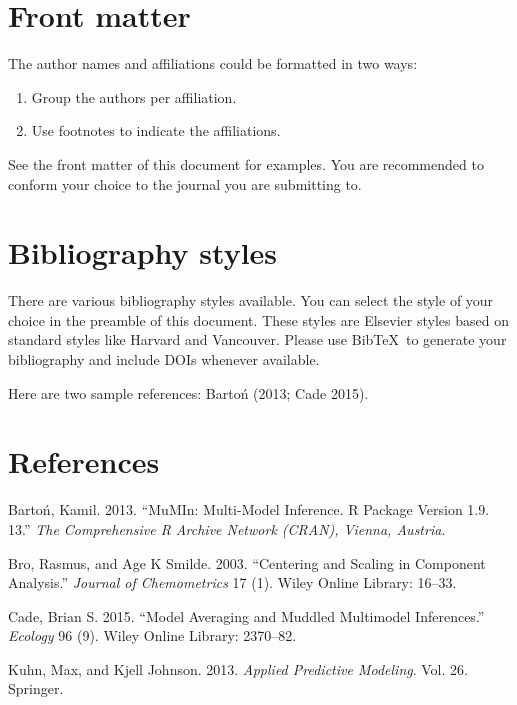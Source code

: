 \documentclass[]{elsarticle} %
\begin{document}
\section{Front matter}\label{front-matter}

The author names and affiliations could be formatted in two ways:

\begin{enumerate}
\def\labelenumi{(\arabic{enumi})}
\item
  Group the authors per affiliation.
\item
  Use footnotes to indicate the affiliations.
\end{enumerate}

See the front matter of this document for examples. You are recommended
to conform your choice to the journal you are submitting to.

\section{Bibliography styles}\label{bibliography-styles}

There are various bibliography styles available. You can select the
style of your choice in the preamble of this document. These styles are
Elsevier styles based on standard styles like Harvard and Vancouver.
Please use BibTeX~to generate your bibliography and include DOIs
whenever available.

Here are two sample references: Barto{ń} (2013; Cade 2015).

\section*{References}\label{references}

Barto{ń}, Kamil. 2013. ``MuMIn: Multi-Model Inference. R Package Version
1.9. 13.'' \emph{The Comprehensive R Archive Network (CRAN), Vienna,
Austria}.

Bro, Rasmus, and Age K Smilde. 2003. ``Centering and Scaling in
Component Analysis.'' \emph{Journal of Chemometrics} 17 (1). Wiley
Online Library: 16--33.

Cade, Brian S. 2015. ``Model Averaging and Muddled Multimodel
Inferences.'' \emph{Ecology} 96 (9). Wiley Online Library: 2370--82.

Kuhn, Max, and Kjell Johnson. 2013. \emph{Applied Predictive Modeling}.
Vol. 26. Springer.
\end{document}
